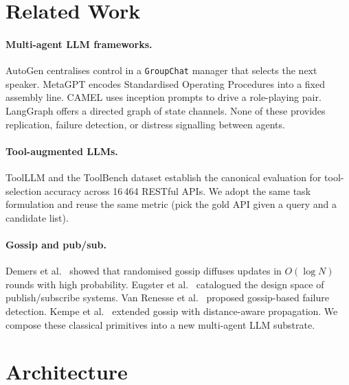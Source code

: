\documentclass[conference]{IEEEtran}
\begin{document}
\section{Related Work}

\paragraph{Multi-agent LLM frameworks.}
AutoGen \cite{wu2023autogen} centralises control in a \texttt{GroupChat}
manager that selects the next speaker. MetaGPT \cite{hong2024metagpt}
encodes Standardised Operating Procedures into a fixed assembly line.
CAMEL \cite{li2023camel} uses inception prompts to drive a role-playing
pair. LangGraph offers a directed graph of state channels. None of these
provides replication, failure detection, or distress signalling between
agents.

\paragraph{Tool-augmented LLMs.}
ToolLLM and the ToolBench dataset \cite{qin2023toolllm} establish the
canonical evaluation for tool-selection accuracy across 16\,464 RESTful APIs.
We adopt the same task formulation and reuse the same metric (pick the gold
API given a query and a candidate list).

\paragraph{Gossip and pub/sub.}
Demers et al.\ \cite{demers1987} showed that randomised gossip diffuses
updates in $O(\log N)$ rounds with high probability. Eugster et al.\
\cite{eugster2003} catalogued the design space of publish/subscribe systems.
Van Renesse et al.\ \cite{vanrenesse1998} proposed gossip-based failure
detection. Kempe et al.\ \cite{kempe2004} extended gossip with
distance-aware propagation. We compose these classical primitives into a
new multi-agent LLM substrate.

\section{Architecture}\label{sec:arch}
\end{document}
